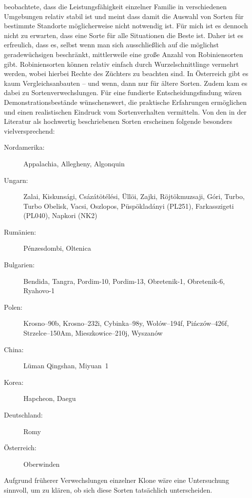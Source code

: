 \documentclass[twocolumn]{scrartcl}
\begin{document}
\citet{bloes1992robinie} beobachtete, dass die Leistungsfähigkeit
einzelner Familie in verschiedenen Umgebungen relativ stabil ist und
meint dass damit die Auswahl von Sorten für bestimmte Standorte
möglicherweise nicht notwendig ist. Für mich ist es dennoch nicht zu erwarten,
dass eine Sorte für alle Situationen die
Beste ist. Daher ist es erfreulich, dass es, selbst wenn man sich
ausschließlich auf die möglichst geradewüchsigen beschränkt, mittlerweile eine
große Anzahl von Robiniensorten gibt. Robiniensorten können relativ
einfach durch Wurzelschnittlinge vermehrt werden, wobei hierbei Rechte
des Züchters zu beachten sind.
In Österreich gibt es kaum Vergleichsanbauten -- und wenn, dann nur für ältere Sorten.
Zudem kam es dabei zu Sortenverwechslungen.
Für eine fundierte Entscheidungsfindung wären Demonstrationsbestände wünschenswert,
die praktische Erfahrungen ermöglichen und einen realistischen Eindruck vom Sortenverhalten vermitteln.
Von den in der Literatur als hochwertig beschriebenen Sorten erscheinen folgende besonders vielversprechend:

\begin{description}
  \item[Nordamerika:] Appalachia, Allegheny, Algonquin
  \item[Ungarn:] Zalai, Kiskunsági, Csázátötélési, Üllöi, Zajki, Röjtökmuzsaji, Góri, Turbo, Turbo Obelisk, Vacsi, Oszlopos, Püspökladányi (PL251), Farkasszigeti (PL040), Napkori (NK2)
  \item[Rumänien:] Pénzesdombi, Oltenica
  \item[Bulgarien:] Bendida, Tangra, Pordim-10, Pordim-13, Obretenik-1, Obretenik-6, Ryahovo-1
  \item[Polen:] Krosno--90b, Krosno--232i, Cybinka--98y, Wołów--194f, Pińczów--426f, Strzelce--150Am, Mieszkowice--210j, Wyszanów
  \item[China:] Lüman Qingshan, Miyuan~1
  \item[Korea:] Hapcheon, Daegu
  \item[Deutschland:] Romy
  \item[Österreich:] Oberwinden
\end{description}

Aufgrund früherer Verwechslungen einzelner Klone
\citep{heinze2014robinie,liesebach2012robinie} wäre eine Untersuchung
sinnvoll, um zu klären, ob sich diese Sorten tatsächlich
unterscheiden.
\end{document}

